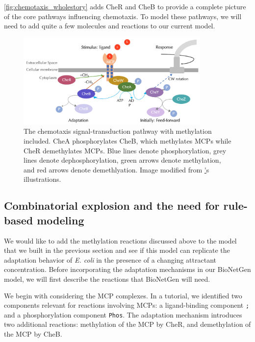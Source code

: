 \autoref{fig:chemotaxis_wholestory} adds CheR and CheB to provide a complete picture of the core pathways influencing chemotaxis. To model these pathways, we will need to add quite a few molecules and reactions to our current model.\\

\begin{figure}[h]
\centering
\mySfFamily
\includegraphics[width = 0.85\textwidth]{../images/chemotaxis_wholestory.png}
\caption{The chemotaxis signal-transduction pathway with methylation included. CheA phosphorylates CheB, which methylates MCPs while CheR demethylates MCPs. Blue lines denote phosphorylation, grey lines denote dephosphorylation, green arrows denote methylation, and red arrows denote demethlyation. Image modified from \href{http://chemotaxis.biology.utah.edu/Parkinson_Lab/projects/ecolichemotaxis/ecolichemotaxis.html}'s illustrations.}
\label{fig:chemotaxis_wholestory}
\end{figure}


\FloatBarrier
{}
\subsection{Combinatorial explosion and the need for rule-based modeling}

We would like to add the methylation reactions discussed above to the model that we built in the previous section and see if this model can replicate the adaptation behavior of \textit{E. coli} in the presence of a changing attractant concentration. Before incorporating the adaptation mechanisms in our BioNetGen model, we will first describe the reactions that BioNetGen will need.

We begin with considering the MCP complexes. In a tutorial,  we identified two components relevant for reactions involving MCPs: a ligand-binding component \texttt{;} and a phosphorylation component \texttt{Phos}. The adaptation mechanism introduces two additional reactions: methylation of the MCP by CheR, and demethylation of the MCP by CheB.

